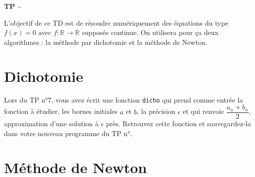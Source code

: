 





\begin{center}
{\Large\bf TP \no {\numero} -- \descrip}
\end{center}


\noindent L'objectif de ce TD est de r\' esoudre num\' eriquement des \' equations du type $f(x)=0$ avec $f\colon \mathbb{R}\to \mathbb{R}$ suppos\' ee continue. On utilisera pour \c ca deux algorithmes : la m\' ethode par dichotomie et la m\' ethode de Newton.

\section{Dichotomie}
Lors du TP n°7, vous avez \' ecrit une fonction \verb?dicho? qui prend comme entr\' ee la fonction \` a \' etudier, les bornes initiales $a$ et $b$, la pr\' ecision $\epsilon$ et qui renvoie $\dfrac{a_n+b_n}{2}$, approximation d’une solution \` a $\epsilon$ pr\` es. Retrouvez cette fonction et sauvegardez-la dans votre nouveau programme du TP n°\numero.

\section{M\' ethode de Newton}

